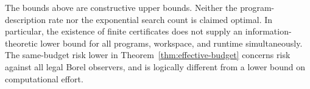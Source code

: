 The bounds above are constructive upper bounds. Neither the program-description rate nor the exponential search count is claimed optimal. In particular, the existence of finite certificates does not supply an information-theoretic lower bound for all programs, workspace, and runtime simultaneously. The same-budget risk lower in Theorem~\ref{thm:effective-budget} concerns risk against all legal Borel observers, and is logically different from a lower bound on computational effort.
